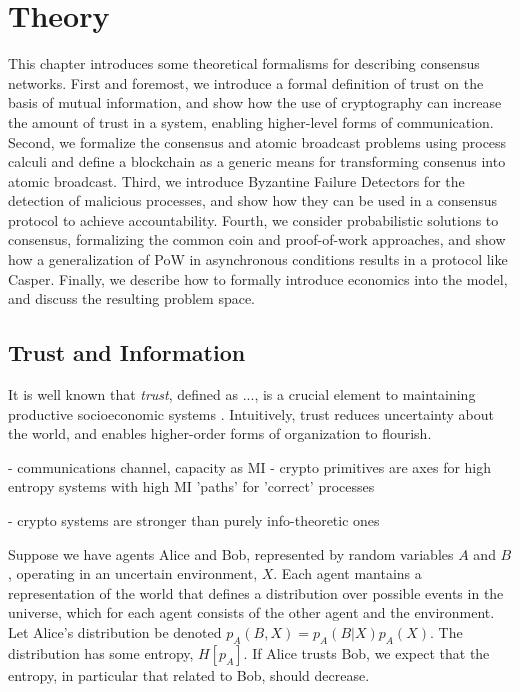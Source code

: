 \chapter{Theory}

This chapter introduces some theoretical formalisms for describing consensus networks.
First and foremost, we introduce a formal definition of trust on the basis of mutual information,
and show how the use of cryptography can increase the amount of trust in a system, 
enabling higher-level forms of communication.
Second, we formalize the consensus and atomic broadcast problems using process calculi 
and define a blockchain as a generic means for transforming consenus into atomic broadcast.
Third, we introduce Byzantine Failure Detectors for the detection of malicious processes,
and show how they can be used in a consensus protocol to achieve accountability.
Fourth, we consider probabilistic solutions to consensus, formalizing the common coin and proof-of-work approaches,
and show how a generalization of PoW in asynchronous conditions results in a protocol like Casper.
Finally, we describe how to formally introduce economics into the model, and discuss the resulting problem space.

\section{Trust and Information}

It is well known that \emph{trust}, defined as ...,
is a crucial element to maintaining productive socioeconomic systems \cite{trust}.
Intuitively, trust reduces uncertainty about the world, 
and enables higher-order forms of organization to flourish.

- communications channel, capacity as MI
- crypto primitives are axes for high entropy systems with high MI 'paths' for 'correct' processes

- crypto systems are stronger than purely info-theoretic ones \cite{ben1988completeness}



Suppose we have agents Alice and Bob, represented by random variables $A$ and $B$, 
operating in an uncertain environment, $X$.
Each agent mantains a representation of the world that defines a distribution over possible events 
in the universe, which for each agent consists of the other agent and the environment.
Let Alice's distribution be denoted $p_A(B, X) = p_A(B | X)p_A(X) $. 
The distribution has some entropy, $H[p_A]$. 
If Alice trusts Bob, we expect that the entropy, in particular that related to Bob, should decrease. 



